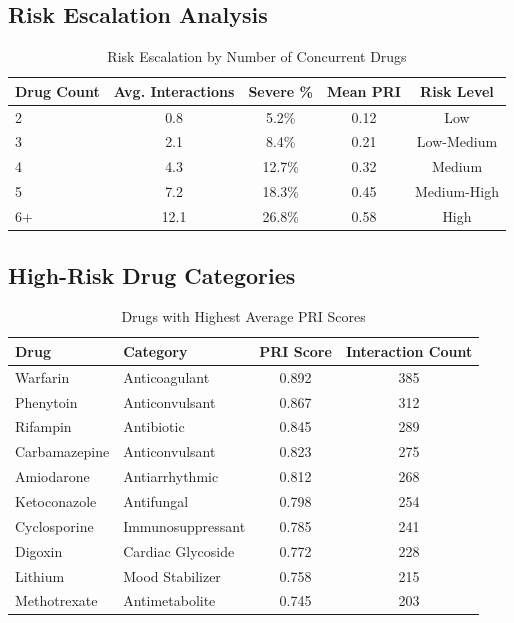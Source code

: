 \documentclass[11pt,a4paper]{article}
\begin{document}
\subsection{Risk Escalation Analysis}

\begin{table}[H]
\centering
\caption{Risk Escalation by Number of Concurrent Drugs}
\label{tab:risk_escalation}
\begin{tabular}{lcccc}
\toprule
\textbf{Drug Count} & \textbf{Avg. Interactions} & \textbf{Severe \%} & \textbf{Mean PRI} & \textbf{Risk Level} \\
\midrule
2 & 0.8 & 5.2\% & 0.12 & Low \\
3 & 2.1 & 8.4\% & 0.21 & Low-Medium \\
4 & 4.3 & 12.7\% & 0.32 & Medium \\
5 & 7.2 & 18.3\% & 0.45 & Medium-High \\
6+ & 12.1 & 26.8\% & 0.58 & High \\
\bottomrule
\end{tabular}
\end{table}

\subsection{High-Risk Drug Categories}

\begin{table}[H]
\centering
\caption{Drugs with Highest Average PRI Scores}
\label{tab:high_pri_drugs}
\begin{tabular}{llcc}
\toprule
\textbf{Drug} & \textbf{Category} & \textbf{PRI Score} & \textbf{Interaction Count} \\
\midrule
Warfarin & Anticoagulant & 0.892 & 385 \\
Phenytoin & Anticonvulsant & 0.867 & 312 \\
Rifampin & Antibiotic & 0.845 & 289 \\
Carbamazepine & Anticonvulsant & 0.823 & 275 \\
Amiodarone & Antiarrhythmic & 0.812 & 268 \\
Ketoconazole & Antifungal & 0.798 & 254 \\
Cyclosporine & Immunosuppressant & 0.785 & 241 \\
Digoxin & Cardiac Glycoside & 0.772 & 228 \\
Lithium & Mood Stabilizer & 0.758 & 215 \\
Methotrexate & Antimetabolite & 0.745 & 203 \\
\bottomrule
\end{tabular}
\end{table}
\end{document}
